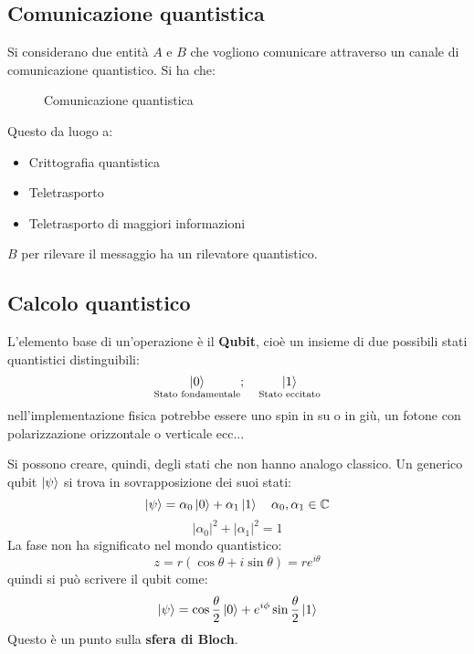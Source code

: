 \documentclass[a4paper]{article}
\begin{document}
\subsection{Comunicazione quantistica}
Si considerano due entità \( A \) e \( B \) che vogliono comunicare attraverso un
canale di comunicazione quantistico. Si ha che:
\begin{figure}[H]
  \centering
  \caption{Comunicazione quantistica}
\end{figure}
\noindent
Questo da luogo a:
\begin{itemize}
  \item Crittografia quantistica
  \item Teletrasporto
  \item Teletrasporto di maggiori informazioni
\end{itemize}
\( B \) per rilevare il messaggio ha un rilevatore quantistico.

\subsection{Calcolo quantistico}
L'elemento base di un'operazione è il \textbf{Qubit}, cioè un insieme di due possibili
stati quantistici distinguibili:
\[
  \underset{\text{Stato fondamentale}}{\ket{0}}; \quad
  \underset{\text{Stato eccitato}}{\ket{1}}
\] 
nell'implementazione fisica potrebbe essere uno spin in su o in giù, un fotone con
polarizzazione orizzontale o verticale ecc...

\vspace{1em}
\noindent
Si possono creare, quindi, degli stati che non hanno analogo classico. Un generico qubit
\( \ket{\psi} \) si trova in sovrapposizione dei suoi stati:
\[
  \ket{\psi} = \alpha_0 \ket{0} + \alpha_1 \ket{1} \quad \alpha_0, \alpha_1 \in \mathbb{C}
\] 
\[
  |\alpha_0|^2 + |\alpha_1|^2 = 1
\] 
La fase non ha significato nel mondo quantistico:
\[
  z = r \left( \cos \theta  + i \sin \theta  \right) = r e^{i \theta }
\] 
quindi si può scrivere il qubit come:
\[
  \ket{\psi} = \cos \frac{\theta }{2} \ket{0} + e^{i \phi } \sin \frac{\theta }{2} \ket{1}
\]
Questo è un punto sulla \textbf{sfera di Bloch}.
\end{document}
